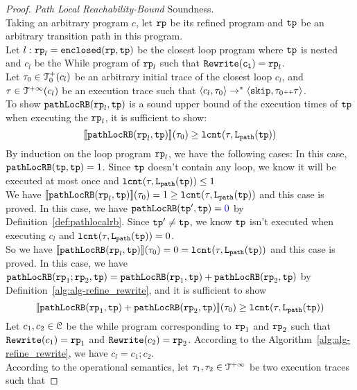 \begin{proof}
\emph{Path Local Reachability-Bound} Soundness.
\\
Taking an arbitrary program $c$, let $\mathtt{rp}$ be its refined program and $\mathtt{tp}$ be an arbitrary transition path in this program.
\\
Let $l: \mathtt{rp}_l = \mathtt{enclosed}(\mathtt{rp}, \mathtt{tp})$ be the closest loop program where $\mathtt{tp}$ is nested and $c_l$ be the While program of $\mathtt{rp}_l$ such that $\mathtt{Rewrite(c_l)} = \mathtt{rp}_l$. 
\\
Let $\mathtt{\tau}_0 \in \mathcal{T}^{+}_0(c_l)$ be an arbitrary initial trace of the closest loop $c_l$, and $\mathtt{\tau} \in \mathcal{T}^{+\infty}(c_l)$ be an execution trace such that $\langle c_l, \mathtt{\tau}_0 \rangle \to^* \langle \mathtt{skip}, \mathtt{\tau}_0 {\scriptscriptstyle ++} \mathtt{\tau} \rangle$.
\\
To show $\mathtt{pathLocRB}(\mathtt{rp}_l, \mathtt{tp})$ is a sound upper bound of the execution times of $\mathtt{tp}$ when executing the $\mathtt{rp}_l$, it is sufficient to show:
\[
  \llbracket \mathtt{pathLocRB}(\mathtt{rp}_l, \mathtt{tp}) \rrbracket(\mathtt{\tau}_0) \geq \mathtt{lcnt}(\mathtt{\tau}, \mathtt{L}_{\mathtt{path}}(\mathtt{tp}))
  \]
By induction on the loop program $\mathtt{rp}_l$,
we have the following cases:
In this case, $\mathtt{pathLocRB}(\mathtt{tp}, \mathtt{tp}) = 1$. 
Since $\mathtt{tp}$ doesn't contain any loop, we know it will be executed at most once and $\mathtt{lcnt}(\mathtt{\tau}, \mathtt{L}_{\mathtt{path}}(\mathtt{tp})) \leq 1$
\\
We have $\llbracket \mathtt{pathLocRB}(\mathtt{rp}_l, \mathtt{tp}) \rrbracket(\mathtt{\tau}_0) = 1 \geq \mathtt{lcnt}(\mathtt{\tau}, \mathtt{L}_{\mathtt{path}}(\mathtt{tp})) $ and this case is proved.
In this case, we have $\outinB(\tpath', \tpath) = \highlight{0} $ by Definition~\ref{def:pathlocalrb}.
Since $\mathtt{tp}' \neq \mathtt{tp}$, we know $\mathtt{tp}$ isn't executed when executing $c_l$ and $\mathtt{lcnt}(\mathtt{\tau}, \mathtt{L}_{\mathtt{path}}(\mathtt{tp})) = 0$.
\\
So we have $\llbracket \mathtt{pathLocRB}(\mathtt{rp}_l, \mathtt{tp}) \rrbracket(\mathtt{\tau}_0) = 0 = \mathtt{lcnt}(\mathtt{\tau}, \mathtt{L}_{\mathtt{path}}(\mathtt{tp})) $ and this case is proved.
In this case, we have $\mathtt{pathLocRB}(\mathtt{rp}_1;\mathtt{rp}_2, \mathtt{tp}) = \mathtt{pathLocRB}(\mathtt{rp}_1, \mathtt{tp}) + \mathtt{pathLocRB}(\mathtt{rp}_2, \mathtt{tp}) $ by Definition~\ref{alg:alg-refine_rewrite}, and
it is sufficient to show
\[
  \llbracket \mathtt{pathLocRB}(\mathtt{rp}_1, \mathtt{tp}) + \mathtt{pathLocRB}(\mathtt{rp}_2, \mathtt{tp}) \rrbracket(\mathtt{\tau}_0) \geq \mathtt{lcnt}(\mathtt{\tau}, \mathtt{L}_{\mathtt{path}}(\mathtt{tp})) 
\]
Let $c_1, c_2 \in \mathcal{C}$ be the while program corresponding to $\mathtt{rp}_1$ and $\mathtt{rp}_2$ such that $\mathtt{Rewrite}(c_1) = \mathtt{rp}_1$ and $\mathtt{Rewrite}(c_2) = \mathtt{rp}_2$.
According to the Algorithm~\ref{alg:alg-refine_rewrite}, we have $c_l = c_1; c_2$.
\\
According to the operational semantics, let $\mathtt{\tau}_1, \mathtt{\tau}_2 \in \mathcal{T}^{+\infty}$ be two execution traces such that 

\end{proof}
